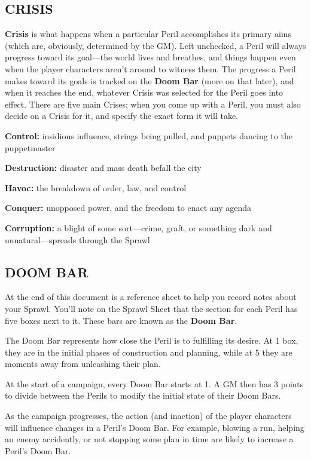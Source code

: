 \documentclass[oneside,10pt]{article}
\begin{document}
\begin{multicols}{2}
\subsection{CRISIS}
\textbf{Crisis} is what happens when a particular Peril accomplishes
its primary aims (which are, obviously, determined by the
GM). Left unchecked, a Peril will always progress toward its
goal—the world lives and breathes, and things happen even
when the player characters aren’t around to witness them.
The progress a Peril makes toward its goals is tracked on the
\textbf{Doom Bar} (more on that later), and when it reaches the end,
whatever Crisis was selected for the Peril goes into effect.
There are five main Crises; when you come up with a Peril,
you must also decide on a Crisis for it, and specify the exact
form it will take.
\begin{dent}

\textbf{Control:} insidious influence, strings being pulled, and puppets dancing to the puppetmaster

\textbf{Destruction:} disaster and mass death befall the city

\textbf{Havoc:} the breakdown of order, law, and control

\textbf{Conquer:} unopposed power, and the freedom to enact
any agenda

\textbf{Corruption:} a blight of some sort—crime, graft, or something dark and unnatural—spreads through the Sprawl
\end{dent}
\subsection{DOOM BAR}
At the end of this document is a reference sheet to help you
record notes about your Sprawl. You’ll note on the Sprawl
Sheet that the section for each Peril has five boxes next to it.
These bars are known as the \textbf{Doom Bar}.

The Doom Bar represents how close the Peril is to fulfilling its
desire. At 1 box, they are in the initial phases of construction
and planning, while at 5 they are moments away from unleashing their plan.

At the start of a campaign, every Doom Bar starts at 1. A GM
then has 3 points to divide between the Perils to modify the
initial state of their Doom Bars.

As the campaign progresses, the action (and inaction) of the
player characters will influence changes in a Peril’s Doom Bar.
For example, blowing a run, helping an enemy accidently, or
not stopping some plan in time are likely to increase a Peril’s
Doom Bar.


\end{multicols}
\end{document}
